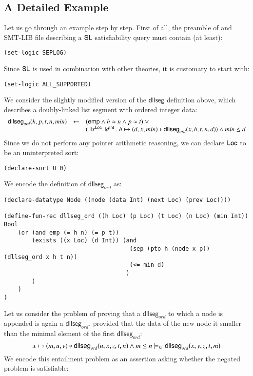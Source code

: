 \documentclass{llncs}
\begin{document}
\subsection{A Detailed Example} 

Let us go through an example step by step. First of all, the preamble
of and SMT-LIB file describing a $\mathsf{SL}$ satisfiability query must
contain (at least): 
\begin{verbatim}
(set-logic SEPLOG)
\end{verbatim}
Since $\mathsf{SL}$ is used in combination with other theories, it is
customary to start with:
\begin{verbatim}
(set-logic ALL_SUPPORTED)
\end{verbatim}
We consider the slightly modified version of the $\mathsf{dllseg}$
definition above, which describes a doubly-linked list segment with
ordered integer data: 
\[\begin{array}{rcl}
\mathsf{dllseg}_{\mathit{ord}}(h, p, t, n, min) & \leftarrow & (\mathsf{emp} \wedge h \approx n \wedge p \approx t) ~\vee \\
&& (\exists x^{\mathsf{Loc}} \exists d^{\mathsf{Int}} ~.~ h \mapsto (d,x,min) * \mathsf{dllseg}_{\mathit{ord}}(x,h,t,n,d)) \wedge min \leq d
\end{array}\]
Since we do not perform any pointer arithmetic reasoning, we can
declare $\mathsf{Loc}$ to be an uninterpreted sort: 
\begin{verbatim}
(declare-sort U 0)
\end{verbatim}
We encode the definition of $\mathsf{dllseg}_{\mathit{ord}}$ as: 
\begin{verbatim}
(declare-datatype Node ((node (data Int) (next Loc) (prev Loc))))

(define-fun-rec dllseg_ord ((h Loc) (p Loc) (t Loc) (n Loc) (min Int)) Bool
    (or (and emp (= h n) (= p t))
        (exists ((x Loc) (d Int)) (and 
                                    (sep (pto h (node x p)) (dllseg_ord x h t n)) 
                                    (<= min d)
                                   )
        )
    )
)
\end{verbatim}
Let us consider the problem of proving that a
$\mathsf{dllseg}_{\mathit{ord}}$ to which a node is appended is again
a $\mathsf{dllseg}_{\mathit{ord}}$, provided that the data of the new
node it smaller than the minimal element of the first
$\mathsf{dllseg}_{\mathit{ord}}$:
\[x \mapsto (m,u,v) * \mathsf{dllseg}_{\mathit{ord}}(u,x,z,t,n) \wedge m \leq n
\models_{\mathsf{\scriptscriptstyle{SL}}} \mathsf{dllseg}_{\mathit{ord}}(x,y,z,t,m)\]
We encode this entailment problem as an assertion asking whether the negated problem is satisfiable:  
\end{document}
